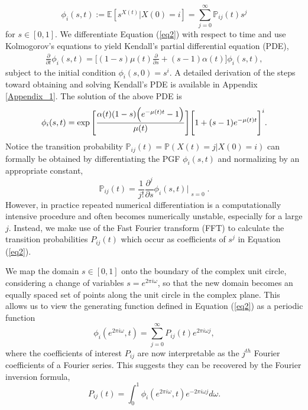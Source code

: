 \documentclass{article}
\newcommand{\achal}[1]{{\color{black}{ #1}}}
\begin{document}
\begin{equation}
    \phi_{i}(s,t) := \mathbb{E}[s^{X(t)}|X(0)=i] = \sum_{j=0}^{\infty}\mathbb{P}_{ij}(t) s^{j}
    \label{eq2}
\end{equation}
for $s \in [0,1]$. We differentiate Equation (\ref{eq2}) with respect to time and use Kolmogorov's equations to yield Kendall’s partial differential equation (PDE), \cite{KARLIN19751, lange2003applied}
\begin{align*}
    \frac{\partial}{\partial{t}}\phi_{i}(s,t)
    = \Bigg[(1-s)\mu(t) \frac{\partial}{\partial{s}} + (s-1)\alpha(t)\Bigg]\phi_{i}(s,t),
\end{align*}
subject to the initial condition $\phi_{i}(s,0) = s^{i}$. A detailed derivation of the steps toward obtaining and solving Kendall's PDE is available in Appendix \ref{Appendix_1}.
The solution of the above PDE is
\begin{equation}
    \phi_{i}(s,t) = \exp\Bigg[{{\dfrac{\alpha(t)(1-s)\Big(e^{-\mu(t) t} - 1\Big)}{\mu(t)}}}\Bigg]\Bigg[1+(s-1)e^{-\mu(t) t}\Bigg]^{i}\achal{.}
    \label{eq:PGF}
\end{equation}
\achal{This closed form solution for the PGF aids in the calculation of transition probabilities.} Notice the transition probability $\mathbb{P}_{ij}(t) = \mathbb{P}(X(t)=j|X(0)=i)$ can formally be obtained by differentiating the PGF $\phi_{i}(s,t)$ and normalizing by an appropriate constant,
\begin{equation}
    \mathbb{P}_{ij}(t) = \frac{1}{j!}\frac{\partial^j}{\partial{s}}\phi_{i}(s,t)\Bigr|_{\substack{s=0}}.
    \label{eq5}
\end{equation}
However, in practice repeated numerical differentiation is a computationally intensive procedure and often becomes numerically unstable, especially for a large $j$. Instead, we make use of the Fast Fourier transform (FFT) to calculate the transition probabilities $P_{ij}(t)$ which occur as coefficients of $s^{j}$ in Equation (\ref{eq2}).\cite{lange1982calculation}\par

We map the domain $s\in [0,1]$ onto the boundary of the complex unit circle, considering a change of variables $s=e^{2\pi i\omega}$, so that the new domain becomes an equally spaced set of points along the unit circle in the complex plane. This allows us to view the generating function defined in Equation (\ref{eq2}) as a periodic function
$$\phi_{i}(e^{2\pi i\omega},t) = \sum_{j=0}^{\infty} P_{ij}(t)e^{2\pi i\omega j},$$
where the coefficients of interest $P_{ij}$ are now interpretable as the $j^{th}$ Fourier coefficients of a Fourier series. This suggests they can be recovered by the Fourier inversion formula,
$$P_{ij}(t) = \int_{0}^{1} \phi_{i}(e^{2\pi i\omega},t)e^{-2\pi i\omega j} d\omega.$$ 
\end{document}
